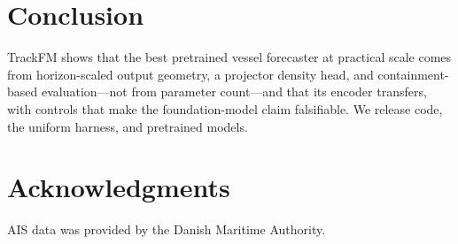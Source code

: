 \documentclass{article}
\begin{document}
\section{Conclusion}
TrackFM shows that the best pretrained vessel forecaster at practical scale
comes from horizon-scaled output geometry, a projector density head, and
containment-based evaluation---not from parameter count---and that its
encoder transfers, with controls that make the foundation-model claim
falsifiable. We release code, the uniform harness, and pretrained models.

\section*{Acknowledgments}
AIS data was provided by the Danish Maritime Authority.



\end{document}
